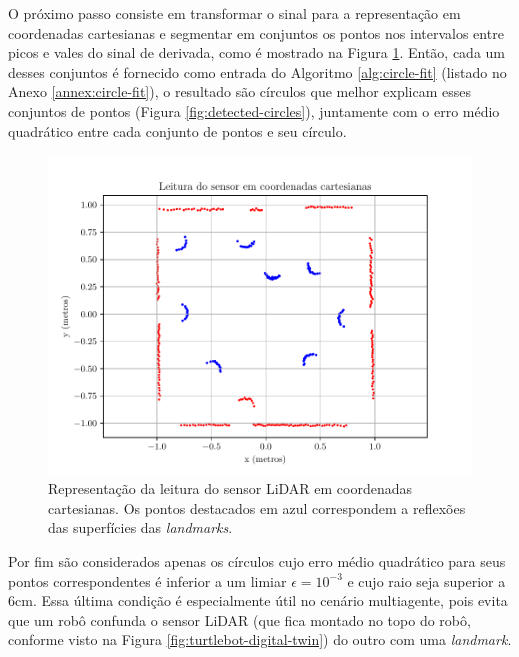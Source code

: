 O próximo passo consiste em transformar o sinal para a representação em 
coordenadas cartesianas e segmentar em conjuntos os pontos nos intervalos entre picos e vales do sinal de derivada, como é mostrado na Figura \ref{fig:sensor-data-cartesian}.
Então, cada um desses conjuntos é fornecido como entrada do Algoritmo 
\ref{alg:circle-fit} (listado no Anexo \ref{annex:circle-fit}), o resultado 
são círculos que melhor explicam esses conjuntos de pontos (Figura \ref{fig:detected-circles}), juntamente com o 
erro médio quadrático entre cada conjunto de pontos e seu círculo.
\begin{figure}[]
  \centering
  \includegraphics[width=.8\textwidth]{figs/sensor_data_cartesian.pdf}
  \caption{Representação da leitura do sensor LiDAR em coordenadas 
  cartesianas. Os pontos destacados em azul correspondem a reflexões 
  das superfícies das \textit{landmarks}.}
  \label{fig:sensor-data-cartesian}
\end{figure}

Por fim são considerados apenas os círculos cujo erro médio quadrático para 
seus pontos correspondentes é inferior a um limiar $\epsilon = 10^{-3}$ e 
cujo raio seja superior a 6cm. Essa última condição é especialmente útil no 
cenário multiagente, pois evita que um robô confunda o sensor LiDAR (que 
fica montado no topo do robô, conforme visto na Figura \ref{fig:turtlebot-digital-twin}) do outro com uma \textit{landmark}.

